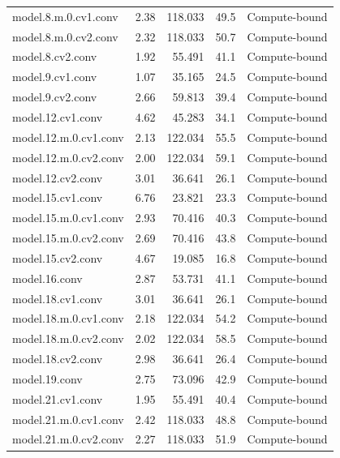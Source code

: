 \documentclass[12pt,a4paper]{report}
\begin{document}
\begin{longtable}{p{} r r r p{}}
model.8.m.0.cv1.conv                 & 2.38  & 118.033 & 49.5 & Compute-bound \\
model.8.m.0.cv2.conv                 & 2.32  & 118.033 & 50.7 & Compute-bound \\
model.8.cv2.conv                     & 1.92  & 55.491  & 41.1 & Compute-bound \\
model.9.cv1.conv                     & 1.07  & 35.165  & 24.5 & Compute-bound \\
model.9.cv2.conv                     & 2.66  & 59.813  & 39.4 & Compute-bound \\
model.12.cv1.conv                    & 4.62  & 45.283  & 34.1 & Compute-bound \\
model.12.m.0.cv1.conv                & 2.13  & 122.034 & 55.5 & Compute-bound \\
model.12.m.0.cv2.conv                & 2.00  & 122.034 & 59.1 & Compute-bound \\
model.12.cv2.conv                    & 3.01  & 36.641  & 26.1 & Compute-bound \\
model.15.cv1.conv                    & 6.76  & 23.821  & 23.3 & Compute-bound \\
model.15.m.0.cv1.conv                & 2.93  & 70.416  & 40.3 & Compute-bound \\
model.15.m.0.cv2.conv                & 2.69  & 70.416  & 43.8 & Compute-bound \\
model.15.cv2.conv                    & 4.67  & 19.085  & 16.8 & Compute-bound \\
model.16.conv                        & 2.87  & 53.731  & 41.1 & Compute-bound \\
model.18.cv1.conv                    & 3.01  & 36.641  & 26.1 & Compute-bound \\
model.18.m.0.cv1.conv                & 2.18  & 122.034 & 54.2 & Compute-bound \\
model.18.m.0.cv2.conv                & 2.02  & 122.034 & 58.5 & Compute-bound \\
model.18.cv2.conv                    & 2.98  & 36.641  & 26.4 & Compute-bound \\
model.19.conv                        & 2.75  & 73.096  & 42.9 & Compute-bound \\
model.21.cv1.conv                    & 1.95  & 55.491  & 40.4 & Compute-bound \\
model.21.m.0.cv1.conv                & 2.42  & 118.033 & 48.8 & Compute-bound \\
model.21.m.0.cv2.conv                & 2.27  & 118.033 & 51.9 & Compute-bound \\

\end{longtable}
\end{document}
